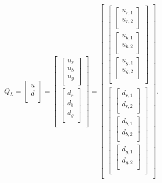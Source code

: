 \begin{equation}
	Q_L=\begin{bmatrix}
		u \\
		d\\
	\end{bmatrix}=\begin{bmatrix}
	\begin{bmatrix}
		u_r\\
		u_b\\
		u_g\\
	\end{bmatrix} \\
	\begin{bmatrix}
		d_r\\
		d_b\\
		d_g\\
	\end{bmatrix}\\
\end{bmatrix}=\begin{bmatrix}
\begin{bmatrix}
	\begin{bmatrix}
		u_{r,1}\\
		u_{r,2}\\
	\end{bmatrix}\\
	\begin{bmatrix}
		u_{b,1}\\
		u_{b,2}\\
	\end{bmatrix}\\
	\begin{bmatrix}
		u_{g,1}\\
		u_{g,2}\\
	\end{bmatrix}\\
\end{bmatrix} \\
\begin{bmatrix}
	\begin{bmatrix}
		d_{r,1}\\
		d_{r,2}\\
	\end{bmatrix}\\
	\begin{bmatrix}
		d_{b,1}\\
		d_{b,2}\\
	\end{bmatrix}\\
	\begin{bmatrix}
		d_{g,1}\\
		d_{g,2}\\
	\end{bmatrix}\\
\end{bmatrix}\\
\end{bmatrix}.
\end{equation} 
